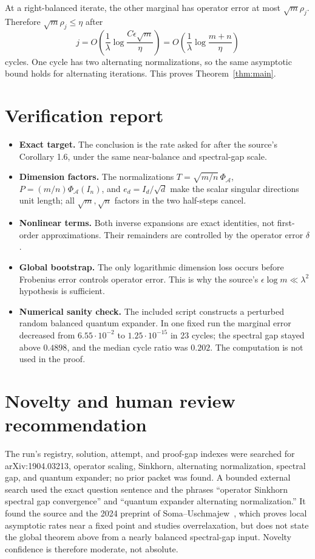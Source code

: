 \documentclass[11pt]{article}
\newcommand{\Acal}{\mathcal A}
\newcommand{\PhiA}{\Phi_{\Acal}}
\begin{document}
At a right-balanced iterate, the other marginal has operator error at most
$\sqrt m\rho_j$.  Therefore $\sqrt m\rho_j\le\eta$ after
\[
 j=O\!\left(\frac1\lambda
 \log\frac{C\epsilon\sqrt m}{\eta}\right)
 =O\!\left(\frac1\lambda\log\frac{m+n}{\eta}\right)
\]
cycles.  One cycle has two alternating normalizations, so the same asymptotic
bound holds for alternating iterations.  This proves Theorem~\ref{thm:main}.

\section{Verification report}

\begin{itemize}[leftmargin=*]
\item \textbf{Exact target.}  The conclusion is the rate asked for after the
source's Corollary 1.6, under the same near-balance and spectral-gap scale.
\item \textbf{Dimension factors.}  The normalizations
$T=\sqrt{m/n}\,\PhiA$, $P=(m/n)\PhiA(I_n)$, and
$e_d=I_d/\sqrt d$ make the scalar singular directions unit length; all
$\sqrt m,\sqrt n$ factors in the two half-steps cancel.
\item \textbf{Nonlinear terms.}  Both inverse expansions are exact identities,
not first-order approximations.  Their remainders are controlled by the
operator error $\delta$.
\item \textbf{Global bootstrap.}  The only logarithmic dimension loss occurs
before Frobenius error controls operator error.  This is why the source's
$\epsilon\log m\ll\lambda^2$ hypothesis is sufficient.
\item \textbf{Numerical sanity check.}  The included script constructs a
perturbed random balanced quantum expander.  In one fixed run the marginal
error decreased from $6.55\cdot10^{-2}$ to $1.25\cdot10^{-15}$ in 23 cycles;
the spectral gap stayed above $0.4898$, and the median cycle ratio was $0.202$.
The computation is not used in the proof.
\end{itemize}

\section{Novelty and human review recommendation}

The run's registry, solution, attempt, and proof-gap indexes were searched for
arXiv:1904.03213, operator scaling, Sinkhorn, alternating normalization,
spectral gap, and quantum expander; no prior packet was found.  A bounded
external search used the exact question sentence and the phrases ``operator
Sinkhorn spectral gap convergence'' and ``quantum expander alternating
normalization.''  It found the source and the 2024 preprint of
Soma--Uschmajew~\cite{SU}, which proves local asymptotic rates near a fixed
point and studies overrelaxation, but does not state the global theorem above
from a nearly balanced spectral-gap input.  Novelty confidence is therefore
moderate, not absolute.
\end{document}
